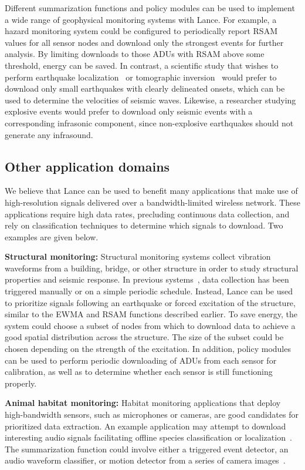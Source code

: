 \documentclass[lettersize]{sig-alternate-konrad}
\begin{document}
Different summarization functions and policy modules can be used to implement
a wide range of geophysical monitoring systems with Lance. For example, a
hazard monitoring system could be configured to periodically report RSAM
values for all sensor nodes and download only the strongest events for
further analysis. By limiting downloads to those ADUs with RSAM above some
threshold, energy can be saved. In contrast, a scientific study that wishes
to perform earthquake localization~\cite{aki-richards-80} or tomographic
inversion~\cite{lees-lindley-94} would prefer to download only small
earthquakes with clearly delineated onsets, which can be used to determine
the velocities of seismic waves. Likewise, a researcher studying explosive
events would prefer to download only seismic events with a corresponding
infrasonic component, since non-explosive earthquakes should not generate any
infrasound.

\subsection{Other application domains}

We believe that Lance can be used to benefit many applications that make use
of high-resolution signals delivered over a bandwidth-limited wireless
network. These applications require high data rates, precluding continuous
data collection, and rely on classification techniques to determine which
signals to download. Two examples are given below.

{\bf Structural monitoring:}
Structural monitoring systems collect vibration
waveforms from a building, bridge, or other structure in order to
study structural properties and seismic response.
In previous systems~\cite{netshm-emnets05,ggb-ipsn07}, data collection
has been triggered manually or on a simple periodic schedule. Instead,
Lance can be used to prioritize signals following an earthquake or 
forced excitation of the structure, similar to the EWMA and RSAM
functions described earlier. To save energy, the system could choose a
subset of nodes from which to download data to achieve a good spatial
distribution across the structure. The size of the subset could be
chosen depending on the strength of the excitation. In addition, 
policy modules can be used to perform periodic downloading of ADUs 
from each sensor for calibration, as well as to determine whether 
each sensor is still functioning properly.

{\bf Animal habitat monitoring:}
Habitat monitoring applications that deploy high-bandwidth sensors, such as
microphones or cameras, are good candidates for prioritized data extraction. 
An example application may attempt to download interesting audio signals
facilitating offline species classification or 
localization~\cite{girod-ipsn07}. The summarization function could
involve either a triggered event detector, an audio waveform
classifier, or motion detector from a series of camera images~\cite{cyclops}.
\end{document}

